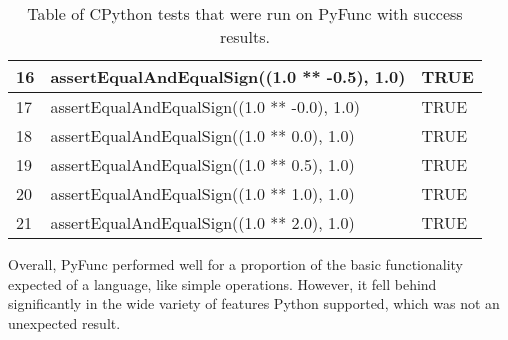 \documentclass{l4proj}
\begin{document}
\begin{table}[H]
\begin{tabular}{|l|l|l|}
        16 & assertEqualAndEqualSign((1.0 ** -0.5), 1.0)  & TRUE \\ \hline
        17 & assertEqualAndEqualSign((1.0 ** -0.0), 1.0)  & TRUE \\ \hline
        18 & assertEqualAndEqualSign((1.0 ** 0.0), 1.0)  & TRUE \\ \hline
        19 & assertEqualAndEqualSign((1.0 ** 0.5), 1.0)  & TRUE \\ \hline
        20 & assertEqualAndEqualSign((1.0 ** 1.0), 1.0)  & TRUE \\ \hline
        21 & assertEqualAndEqualSign((1.0 ** 2.0), 1.0)  & TRUE \\ \hline
    \end{tabular}
    \caption{Table of CPython tests that were run on PyFunc with success results.}
    \label{tbl:eval-floats}
\end{table}




Overall, PyFunc performed well for a proportion of the basic functionality expected of a language, like simple operations.
However, it fell behind significantly in the wide variety of features Python supported, which was not an unexpected result.




\end{document}
